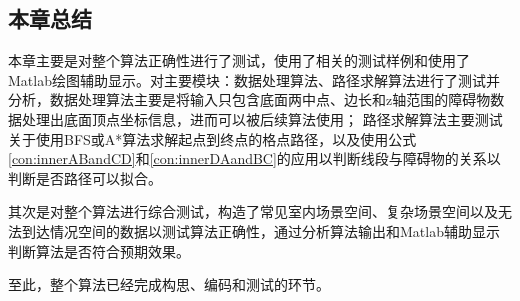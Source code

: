 \FloatBarrier
\subsection{本章总结}
\par{\kaishu 本章主要是对整个算法正确性进行了测试，使用了相关的测试样例和使用了Matlab绘图辅助显示。对主要模块：数据处理算法、路径求解算法进行了测试并分析，数据处理算法主要是将输入只包含底面两中点、边长和z轴范围的障碍物数据处理出底面顶点坐标信息，进而可以被后续算法使用；
路径求解算法主要测试关于使用BFS或A*算法求解起点到终点的格点路径，以及使用公式\ref{con:innerABandCD}和\ref{con:innerDAandBC}的应用以判断线段与障碍物的关系以判断是否路径可以拟合。
\par 其次是对整个算法进行综合测试，构造了常见室内场景空间、复杂场景空间以及无法到达情况空间的数据以测试算法正确性，通过分析算法输出和Matlab辅助显示判断算法是否符合预期效果。
\par 至此，整个算法已经完成构思、编码和测试的环节。}